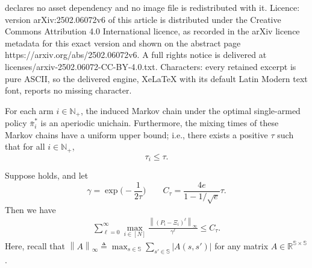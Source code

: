 \documentclass[10pt,a4paper]{amsart}
\newcommand{\Ctau}{C_\tau}
\newcommand{\R}{\mathbb{R}}
\newcommand{\abs}[1]{\left\lvert#1\right\rvert}
\newcommand{\norm}[1]{\left\lVert#1\right\rVert}
\newcommand{\sspa}{\mathbb{S}}
\newcommand{\tmix}{\tau}
\begin{document}
declares no asset dependency and no image file is redistributed with it. Licence: version arXiv:2502.06072v6 of this article is distributed under the Creative Commons Attribution 4.0 International licence, as recorded in the arXiv licence metadata for this exact version and shown on the abstract page https://arxiv.org/abs/2502.06072v6. A full rights notice is delivered at licenses/arxiv-2502.06072-CC-BY-4.0.txt. Characters: every retained excerpt is pure ASCII, so the delivered engine, XeLaTeX with its default Latin Modern text font, reports no missing character.
\begin{assumption}\label{ass:unichain}
    For each arm $i\in\mathbb{N}_+$, the induced Markov chain under the optimal single-armed policy $\bar{\pi}_i^*$ is an aperiodic unichain. 
    Furthermore, the mixing times of these Markov chains have a uniform upper bound; i.e., there exists a positive $\tau$ such that for all $i\in\mathbb{N}_+$, 
    \begin{equation}
        \tmix_i \leq \tau.
    \end{equation}
\end{assumption}

\begin{lemma}\label{lem:cgamma}
    Suppose  holds, and let
    \[
        \gamma = \exp\Big(-\frac{1}{2\tau}\Big) \qquad \Ctau = \frac{4e}{1-1/\sqrt{e}} \tau.
    \]
    Then we have
    \begin{align*}
        \sum_{\ell=0}^{\infty} \max_{i\in[N]}\frac{\norm{(P_i-\Xi_i)^\ell}_\infty}{\gamma^\ell} \leq \Ctau. 
\end{align*}
 Here, recall that $\norm{A}_\infty \triangleq \max_{s\in\sspa} \sum_{s'\in\sspa}\abs{A(s,s')}$ for any matrix $A\in \R^{\sspa\times\sspa}$. 
\end{lemma}
\end{document}
